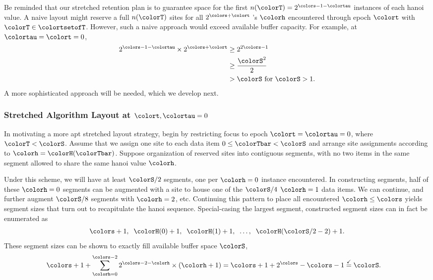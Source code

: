 

Be reminded that our stretched retention plan is to guarantee space for the first $n(\colorT) =  2^{\colors - 1 - \colortau}$ instances of each hanoi value.
A naive layout might reserve a full $n(\colorT)$ sites for all $2^{\colors + \colort}$ \hv{}'s $\colorh$ encountered through epoch $\colort$ with $\colorT \in \colortsetofT$.
However, such a naive approach would exceed available buffer capacity.
For example, at $\colortau=\colort=0$,
\begin{align*}
2^{\colors - 1 - \colortau} \times 2^{\colors + \colort}
&\geq
2^{2\colors - 1}\\
&\geq
\frac{\colorS^{2}}{2}\\
&> \colorS \text{ for } \colorS > 1.
\end{align*}
A more sophisticated approach will be needed, which we develop next.

\subsubsection{Stretched Algorithm Layout at $\colort,\colortau=0$}

In motivating a more apt stretched layout strategy, begin by restricting focus to epoch $\colort=\colortau=0$, where $\colorT < \colorS$.
Assume that we assign one site to each data item $0\leq \colorTbar < \colorS$ and arrange site assignments according to \hv{} $\colorh = \colorH(\colorTbar)$.
Suppose organization of reserved sites into contiguous segments, with no two items in the same segment allowed to share the same hanoi value $\colorh$.

Under this scheme, we will have at least $\colorS/2$ segments, one per \hv{} $\colorh=0$ instance encountered.
In constructing segments, half of these $\colorh=0$ segments can be augmented with a site to house one of the $\colorS/4$ \hv{} $\colorh=1$ data items.
We can continue, and further augment $\colorS/8$ segments with \hv{} $\colorh=2$, etc.
Continuing this pattern to place all encountered \hv{} $\colorh\leq\colors$ yields segment sizes that turn out to recapitulate the hanoi sequence.
Special-casing the largest segment, constructed segment sizes can in fact be enumerated as
\begin{align}
\colors + 1,\;\; \colorH(0) + 1,\;\; \colorH(1) + 1,\;\; \ldots,\;\; \colorH(\colorS/2 - 2) + 1.
\label{eqn:stretched-segment-sizes}
\end{align}
These segment sizes can be shown to exactly fill available buffer space $\colorS$,
\begin{align*}
\colors + 1
+  \sum_{\colorh = 0}^{\colors - 2}
2^{\colors - 2 - \colorh} \times (\colorh + 1)
&=
\colors + 1 +
2^{\colors} - \colors - 1
\stackrel{\checkmark}{=}
\colorS.
\end{align*}

